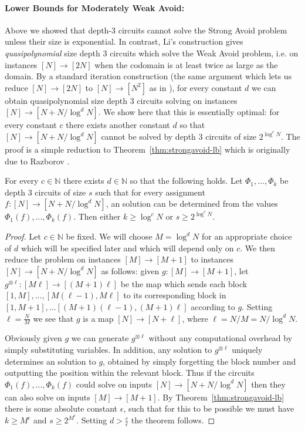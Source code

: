 \paragraph{Lower Bounds for Moderately Weak Avoid:}
Above we showed that depth-3 circuits cannot solve the {\sc Strong Avoid} problem unless their size is exponential. In contrast, Li's construction gives \emph{quasipolynomial} size depth 3 circuits which solve the {\sc Weak Avoid} problem, i.e. \avoid on instances $[N] \to [2N]$ when the codomain is at least twice as large as the domain. By a standard iteration construction (the same argument which lets us reduce $[N] \to [2N]$ \avoid to $[N] \to [N^2]$ \avoid as in \cite{Korten}), for every constant $d$ we can obtain quasipolynomial size depth 3 circuits solving \avoid on instances $[N] \to [N+N/\log^dN]$. We show here that this is essentially optimal: for every constant $c$ there exists another constant $d$ so that $[N] \to [N+N/\log^dN]$ \avoid cannot be solved by depth 3 circuits of size $2^{\log^cN}$. The proof is a simple reduction to Theorem~\ref{thm:strongavoid-lb} which is originally due to Razborov \cite{raz-talk}.
\begin{lemma}\label{lem:php-lb-larger-stretch}
For every $c \in \mathbb{N}$ there exists $d \in \mathbb{N}$ so that the following holds. Let $\Phi_1,\ldots,\Phi_k$ be depth 3 circuits of size $s$ such that for every assignment $f:[N] \to [N+N/\log^dN]$, an \avoid solution can be determined from the values $\Phi_1(f),\ldots,\Phi_k(f)$. Then either $k \geq \log^cN$ or $s \geq 2^{\log^c N}$.
\end{lemma}
\begin{proof}
Let $c \in \mathbb{N}$ be fixed. We will choose $M = \log^dN$ for an appropriate choice of $d$ which will be specified later and which will depend only on $c$. We then reduce the \avoid problem on instances $[M] \to [M+1]$ to instances $[N] \to [N+N/\log^dN]$ as follows: given $g: [M] \to [M+1]$, let $g^{\otimes \ell}: [M\ell] \to [(M+1)\ell]$ be the map which sends each block $[1,M], \ldots, [M(\ell-1), M\ell]$ to its corresponding block in $[1,M+1], \ldots [(M+1)(\ell-1),(M+1)\ell]$ according to $g$. Setting $\ell = \frac{N}{M}$ we see that $g$ is a map $[N] \to [N + \ell]$, where $\ell = N/M = N/\log^d N$. 

Obviously given $g$ we can generate $g^{\otimes \ell}$ without any computational overhead by simply substituting variables. In addition, any \avoid solution to $g^{\otimes \ell}$ uniquely determines an \avoid solution to $g$, obtained by simply forgetting the block number and outputting the position within the relevant block. Thus if the circuits $\Phi_1(f),\ldots,\Phi_k(f)$ could solve \avoid on inputs $[N] \to [N+N/\log^dN]$ then they can also solve \avoid on inputs $[M] \to [M+1]$. By Theorem~\ref{thm:strongavoid-lb} there is some absolute constant $\epsilon$, such that for this to be possible we must have $k \geq M^{\epsilon}$ and $s \geq 2^{M^{\epsilon}}$. Setting $d > \frac{c}{\epsilon}$ the theorem follows.
\end{proof}

